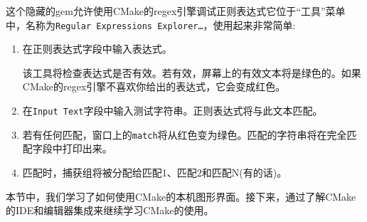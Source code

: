 这个隐藏的gem允许使用CMake的regex引擎调试正则表达式它位于“工具”菜单中，名称为\texttt{Regular Expressions Explorer…}，使用起来非常简单:

\begin{enumerate}
\item 
在正则表达式字段中输入表达式。

该工具将检查表达式是否有效。若有效，屏幕上的有效文本将是绿色的。如果CMake的regex引擎不喜欢你给出的表达式，它会变成红色。

\item 
在\texttt{Input Text}字段中输入测试字符串。正则表达式将与此文本匹配。

\item 
若有任何匹配，窗口上的\texttt{match}将从红色变为绿色。匹配的字符串将在完全匹配字段中打印出来。

\item 
匹配时，捕获组将被分配给匹配1、匹配2和匹配N(有的话)。
\end{enumerate}

本节中，我们学习了如何使用CMake的本机图形界面。接下来，通过了解CMake的IDE和编辑器集成来继续学习CMake的使用。
